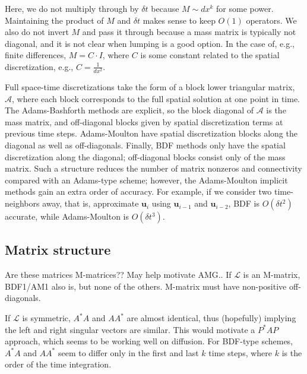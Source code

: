 \documentclass[a4paper,12pt]{article}
\begin{document}
%
Here, we do not multiply through by $\delta t$ because $M \sim dx^k$ for some power. Maintaining the product of $M$ and
$\delta t$ makes sense to keep $O(1)$ operators. We also do not invert $M$ and pass it through because a mass matrix is typically
not diagonal, and it is not clear when lumping is a good option. In the case of, e.g., finite differences, $M = C\cdot I$, where
$C$ is some constant related to the spatial discretization, e.g., $C = \tfrac{1}{dx^2}$.

Full space-time discretizations take the form of a block lower triangular matrix, $\mathcal{A}$, where each block corresponds to the full
spatial solution at one point in time. The Adams-Bashforth methods are explicit, so the block diagonal of $\mathcal{A}$ is the mass matrix,
and off-diagonal blocks given by spatial discretization terms at previous time steps. Adams-Moulton have spatial discretization blocks
along the diagonal as well as off-diagonals. Finally, BDF methods only have the spatial discretization along the diagonal; off-diagonal
blocks consist only of the mass matrix. Such a structure reduces the number of matrix nonzeros and connectivity compared with an
Adams-type scheme; however, the Adams-Moulton implicit methods gain an extra order of accuracy. For example, if we consider
two time-neighbors away, that is, approximate $\mathbf{u}_i$ using $\mathbf{u}_{i-1}$ and $\mathbf{u}_{i-2}$, BDF is $O(\delta t^2)$
accurate, while Adams-Moulton is $O(\delta t^3)$. 

\subsection{Matrix structure}

Are these matrices M-matrices?? May help motivate AMG.. If $\mathcal{L}$ is an M-matrix, BDF1/AM1 also is, but none of the others.
M-matrix must have non-positive off-diagonals.

If $\mathcal{L}$ is symmetric, $A^*A$ and $AA^*$ are almost identical, thus (hopefully) implying the left and right singular vectors are
similar. This would motivate a $P^*AP$ approach, which seems to be working well on diffusion. For BDF-type schemes, $A^*A$ and $AA^*$
seem to differ only in the first and last $k$ time steps, where $k$ is the order of the time integration.
\end{document}

